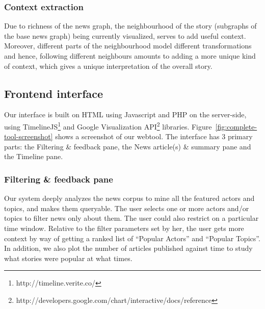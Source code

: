 \subsubsection*{Context extraction}
Due to richness of the news graph, the neighbourhood of the story (subgraphs of the base news graph) being currently visualized, serves to add
useful context. Moreover, different parts of the neighbourhood model different transformations and hence, following
different neighbours amounts to adding a more unique kind of context, which gives a unique interpretation of the overall story. 
\subsection {Frontend interface}
Our interface is built on HTML using Javascript and PHP on the server-side, using TimelineJS\footnote{http://timeline.verite.co/} and Google Visualization API\footnote{http://developers.google.com/chart/interactive/docs/reference} libraries.
Figure~\ref{fig:complete-tool-screenshot} shows a screenshot of our webtool. The interface
has 3 primary parts: the Filtering \& feedback pane, the News article(s) \& summary pane and the Timeline pane. 
\subsubsection*{Filtering \& feedback pane}
Our system deeply analyzes the news corpus to mine all the featured actors and topics, and makes them queryable. The user selects one or more actors
and/or topics to filter news only about them. The user could also restrict on a particular time window. Relative to the filter parameters set by her, 
the user gets more context by way of getting a ranked list of ``Popular Actors'' and ``Popular Topics''. In addition, we also plot the number of
articles published against time to study what stories were popular at what times. 

